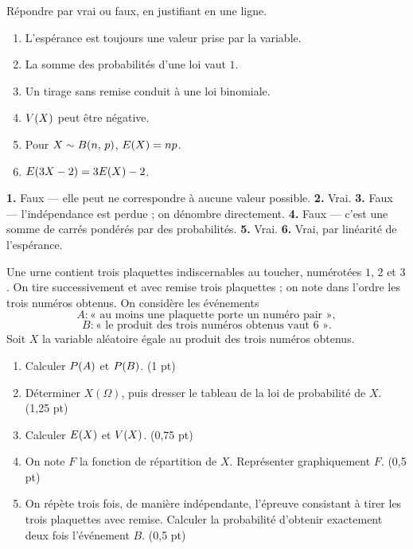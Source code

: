 \begin{jemeteste}
Répondre par vrai ou faux, en justifiant en une ligne.

\begin{enumerate}[label=\textbf{\arabic*.}, leftmargin=*, itemsep=0.28em]
  \item L'espérance est toujours une valeur prise par la variable.
  \item La somme des probabilités d'une loi vaut $1$.
  \item Un tirage sans remise conduit à une loi binomiale.
  \item $V(X)$ peut être négative.
  \item Pour $X \sim B(n,\,p)$, $E(X) = np$.
  \item $E(3X-2) = 3E(X)-2$.
\end{enumerate}
\end{jemeteste}

\begin{corrige}[je me teste]
\textbf{1.} Faux — elle peut ne correspondre à aucune valeur possible.
\textbf{2.} Vrai.
\textbf{3.} Faux — l'indépendance est perdue ; on dénombre directement.
\textbf{4.} Faux — c'est une somme de carrés pondérés par des probabilités.
\textbf{5.} Vrai.
\textbf{6.} Vrai, par linéarité de l'espérance.
\end{corrige}

\begin{commeaubac}
Une urne contient trois plaquettes indiscernables au toucher, numérotées $1$,
$2$ et $3$. On tire successivement et avec remise trois plaquettes ; on note
dans l'ordre les trois numéros obtenus. On considère les événements
\[
  A : \text{« au moins une plaquette porte un numéro pair »},
\]
\[
  B : \text{« le produit des trois numéros obtenus vaut $6$ »} .
\]
Soit $X$ la variable aléatoire égale au produit des trois numéros obtenus.

\begin{enumerate}[label=\textbf{\arabic*.}, leftmargin=*, itemsep=0.25em]
  \item Calculer $P\!\left(A\right)$ et $P\!\left(B\right)$. \hfill\textup{(1 pt)}
  \item Déterminer $X(\Omega)$, puis dresser le tableau de la loi de
        probabilité de $X$. \hfill\textup{(1,25 pt)}
  \item Calculer $E(X)$ et $V(X)$. \hfill\textup{(0,75 pt)}
  \item On note $F$ la fonction de répartition de $X$. Représenter
        graphiquement $F$. \hfill\textup{(0,5 pt)}
  \item On répète trois fois, de manière indépendante, l'épreuve consistant à
        tirer les trois plaquettes avec remise. Calculer la probabilité
        d'obtenir exactement deux fois l'événement $B$. \hfill\textup{(0,5 pt)}
\end{enumerate}
\end{commeaubac}


